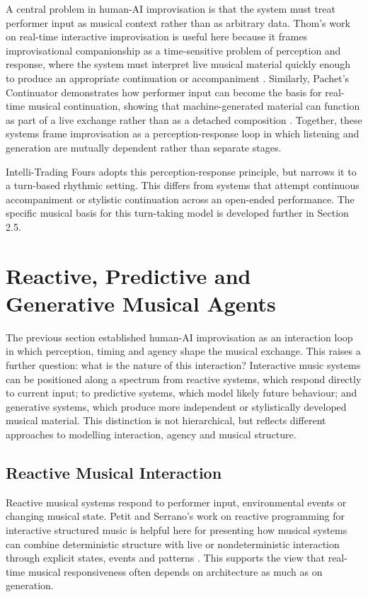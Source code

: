 A central problem in human-AI improvisation is that the system must
treat performer input as musical context rather than as arbitrary data.
Thom's work on real-time interactive improvisation is useful here
because it frames improvisational companionship as a time-sensitive
problem of perception and response, where the system must interpret live
musical material quickly enough to produce an appropriate continuation
or accompaniment \citep{thom2000bob}. Similarly, Pachet's Continuator
demonstrates how performer input can become the basis for real-time
musical continuation, showing that machine-generated material can
function as part of a live exchange rather than as a detached
composition \citep{pachet2002continuator}. Together, these systems frame improvisation
as a perception-response loop in which listening and generation are
mutually dependent rather than separate stages.

Intelli-Trading Fours adopts this perception-response principle, but
narrows it to a turn-based rhythmic setting. This differs from systems
that attempt continuous accompaniment or stylistic continuation across
an open-ended performance. The specific musical basis for this
turn-taking model is developed further in Section 2.5.

\section{Reactive, Predictive and Generative Musical Agents}\label{reactive-predictive-and-generative-musical-agents}

The previous section established human-AI improvisation as an
interaction loop in which perception, timing and agency shape the
musical exchange. This raises a further question: what is the nature of
this interaction? Interactive music systems can be positioned along a
spectrum from reactive systems, which respond directly to current input;
to predictive systems, which model likely future behaviour; and
generative systems, which produce more independent or stylistically
developed musical material. This distinction is not hierarchical, but
reflects different approaches to modelling interaction, agency and
musical structure.

\subsection{Reactive Musical Interaction}\label{reactive-musical-interaction}

Reactive musical systems respond to performer input, environmental
events or changing musical state. Petit and Serrano's work on reactive
programming for interactive structured music is helpful here for
presenting how musical systems can combine deterministic structure with
live or nondeterministic interaction through explicit states, events and
patterns \citep{petit2021reactive}. This supports the view that
real-time musical responsiveness often depends on architecture as much
as on generation.

